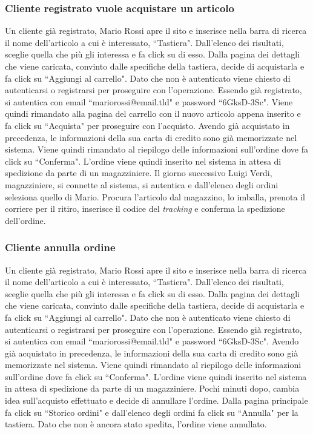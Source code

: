 \documentclass[12pt]{article}
\begin{document}
\subsubsection{Cliente registrato vuole acquistare un articolo}
Un cliente già registrato, Mario Rossi apre il sito e inserisce nella barra di ricerca il nome dell'articolo a cui è interessato, ``Tastiera".
Dall'elenco dei risultati, sceglie quella che più gli interessa e fa click su di esso.
Dalla pagina dei dettagli che viene caricata, convinto dalle specifiche della tastiera, decide di acquistarla e fa click su ``Aggiungi al carrello".
Dato che non è autenticato viene chiesto di autenticarsi o registrarsi per proseguire con l'operazione.
Essendo già registrato, si autentica con email ``mariorossi@email.tld" e password ``6GksD-3Sc".
Viene quindi rimandato alla pagina del carrello con il nuovo articolo appena inserito e fa click su ``Acquista" per proseguire con l'acquisto.
Avendo già acquistato in precedenza, le informazioni della sua carta di credito sono già memorizzate nel sistema.
Viene quindi rimandato al riepilogo delle informazioni sull'ordine dove fa click su ``Conferma".
L'ordine viene quindi inserito nel sistema in attesa di spedizione da parte di un magazziniere.
Il giorno successivo Luigi Verdi, magazziniere, si connette al sistema, si autentica e dall'elenco degli ordini seleziona quello di Mario. Procura l'articolo dal magazzino, lo imballa, prenota il corriere per il ritiro, inserisce il codice del \emph{tracking} e conferma la spedizione dell'ordine.

\subsubsection{Cliente annulla ordine}
Un cliente già registrato, Mario Rossi apre il sito e inserisce nella barra di ricerca il nome dell'articolo a cui è interessato, ``Tastiera".
Dall'elenco dei risultati, sceglie quella che più gli interessa e fa click su di esso.
Dalla pagina dei dettagli che viene caricata, convinto dalle specifiche della tastiera, decide di acquistarla e fa click su ``Aggiungi al carrello".
Dato che non è autenticato viene chiesto di autenticarsi o registrarsi per proseguire con l'operazione.
Essendo già registrato, si autentica con email ``mariorossi@email.tld" e password ``6GksD-3Sc".
Avendo già acquistato in precedenza, le informazioni della sua carta di credito sono già memorizzate nel sistema.
Viene quindi rimandato al riepilogo delle informazioni sull'ordine dove fa click su ``Conferma".
L'ordine viene quindi inserito nel sistema in attesa di spedizione da parte di un magazziniere.
Pochi minuti dopo, cambia idea sull'acquisto effettuato e decide di annullare l'ordine.
Dalla pagina principale fa click su ``Storico ordini" e dall'elenco degli ordini fa click su ``Annulla" per la tastiera.
Dato che non è ancora stato spedita, l'ordine viene annullato.
\end{document}
